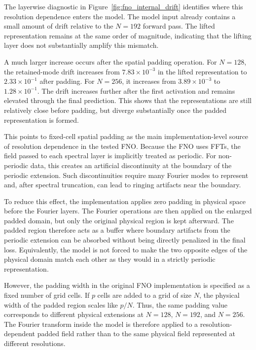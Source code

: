 The layerwise diagnostic in Figure~\ref{fig:fno_internal_drift} identifies where this resolution dependence enters the model. The model input already contains a small amount of drift relative to the \(N=192\) forward pass. The lifted representation remains at the same order of magnitude, indicating that the lifting layer does not substantially amplify this mismatch.

A much larger increase occurs after the spatial padding operation. For \(N=128\), the retained-mode drift increases from \(7.83\times10^{-3}\) in the lifted representation to \(2.33\times10^{-1}\) after padding. For \(N=256\), it increases from \(3.89\times10^{-3}\) to \(1.28\times10^{-1}\). The drift increases further after the first activation and remains elevated through the final prediction. This shows that the representations are still relatively close before padding, but diverge substantially once the padded representation is formed.

This points to fixed-cell spatial padding as the main implementation-level source of resolution dependence in the tested FNO. Because the FNO uses FFTs, the field passed to each spectral layer is implicitly treated as periodic. For non-periodic data, this creates an artificial discontinuity at the boundary of the periodic extension. Such discontinuities require many Fourier modes to represent and, after spectral truncation, can lead to ringing artifacts near the boundary.

To reduce this effect, the implementation applies zero padding in physical space before the Fourier layers. The Fourier operations are then applied on the enlarged padded domain, but only the original physical region is kept afterward. The padded region therefore acts as a buffer where boundary artifacts from the periodic extension can be absorbed without being directly penalized in the final loss. Equivalently, the model is not forced to make the two opposite edges of the physical domain match each other as they would in a strictly periodic representation.

However, the padding width in the original FNO implementation is specified as a fixed number of grid cells. If \(p\) cells are added to a grid of size \(N\), the physical width of the padded region scales like \(p/N\). Thus, the same padding value corresponds to different physical extensions at \(N=128\), \(N=192\), and \(N=256\). The Fourier transform inside the model is therefore applied to a resolution-dependent padded field rather than to the same physical field represented at different resolutions.

